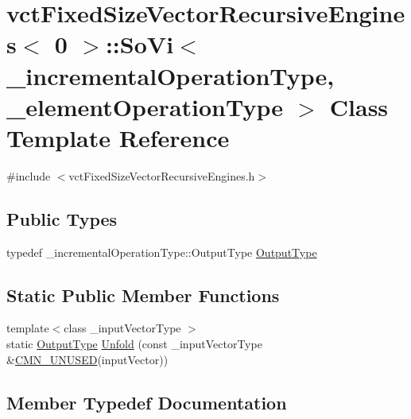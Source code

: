 \hypertarget{classvct_fixed_size_vector_recursive_engines_3_010_01_4_1_1_so_vi}{}\section{vct\+Fixed\+Size\+Vector\+Recursive\+Engines$<$ 0 $>$\+:\+:So\+Vi$<$ \+\_\+incremental\+Operation\+Type, \+\_\+element\+Operation\+Type $>$ Class Template Reference}
\label{classvct_fixed_size_vector_recursive_engines_3_010_01_4_1_1_so_vi}


{\ttfamily \#include $<$vct\+Fixed\+Size\+Vector\+Recursive\+Engines.\+h$>$}

\subsection*{Public Types}
\begin{DoxyCompactItemize}
\item 
typedef \+\_\+incremental\+Operation\+Type\+::\+Output\+Type \hyperlink{classvct_fixed_size_vector_recursive_engines_3_010_01_4_1_1_so_vi_aa27e2cc5e89fd284608b25bb66a5047b}{Output\+Type}
\end{DoxyCompactItemize}
\subsection*{Static Public Member Functions}
\begin{DoxyCompactItemize}
\item 
{\footnotesize template$<$class \+\_\+input\+Vector\+Type $>$ }\\static \hyperlink{classvct_fixed_size_vector_recursive_engines_3_010_01_4_1_1_so_vi_aa27e2cc5e89fd284608b25bb66a5047b}{Output\+Type} \hyperlink{classvct_fixed_size_vector_recursive_engines_3_010_01_4_1_1_so_vi_a46b9db368fdc70084577433bc260597d}{Unfold} (const \+\_\+input\+Vector\+Type \&\hyperlink{cmn_portability_8h_a021894e2626935fa2305434b1e893ff6}{C\+M\+N\+\_\+\+U\+N\+U\+S\+E\+D}(input\+Vector))
\end{DoxyCompactItemize}


\subsection{Member Typedef Documentation}
\hypertarget{classvct_fixed_size_vector_recursive_engines_3_010_01_4_1_1_so_vi_aa27e2cc5e89fd284608b25bb66a5047b}{}
